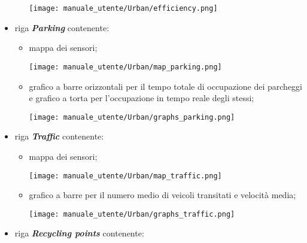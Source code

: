 \begin{itemize}
\begin{itemize}
        \begin{center}
            \texttt{[image: manuale\_utente/Urban/efficiency.png]}
        \end{center}
    \end{itemize}
    \item riga \textit{\textbf{Parking}} contenente:
    \begin{itemize}
        \item mappa dei sensori;
        \begin{center}
            \texttt{[image: manuale\_utente/Urban/map\_parking.png]}
        \end{center}
        \item grafico a barre orizzontali per il tempo totale di occupazione dei parcheggi e grafico a torta per l'occupazione in tempo reale degli stessi;
        \begin{center}
            \texttt{[image: manuale\_utente/Urban/graphs\_parking.png]}
        \end{center}
    \end{itemize}
    \item riga \textit{\textbf{Traffic}} contenente:
    \begin{itemize}
        \item mappa dei sensori;
        \begin{center}
            \texttt{[image: manuale\_utente/Urban/map\_traffic.png]}
        \end{center}
        \item grafico a barre per il numero medio di veicoli transitati e velocità media;
        \begin{center}
            \texttt{[image: manuale\_utente/Urban/graphs\_traffic.png]}
        \end{center}
    \end{itemize}
    \item riga \textit{\textbf{Recycling points}} contenente:

\end{itemize}
